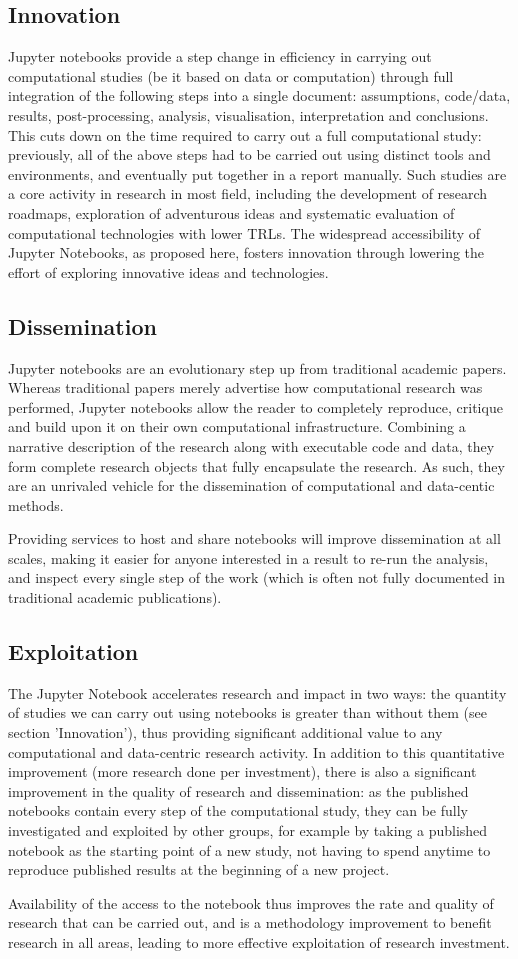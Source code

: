 \subsection{Innovation}

Jupyter notebooks provide a step change in efficiency in carrying out
computational studies (be it based on data or computation) through
full integration of the following steps into a single document:
assumptions, code/data, results, post-processing, analysis,
visualisation, interpretation and conclusions. This cuts down on the
time required to carry out a full computational study: previously, all
of the above steps had to be carried out using distinct tools and
environments, and eventually put together in a report manually. Such
studies are a core activity in research in most field, including the
development of research roadmaps, exploration of adventurous ideas and
systematic evaluation of computational technologies with lower
TRLs. The widespread accessibility of Jupyter Notebooks, as proposed
here, fosters innovation through lowering the effort of exploring
innovative ideas and technologies.


\subsection{Dissemination}

Jupyter notebooks are an evolutionary step up from traditional
academic papers.  Whereas traditional papers merely advertise how
computational research was performed, Jupyter notebooks allow the
reader to completely reproduce, critique and build upon it on their
own computational infrastructure.  Combining a narrative description
of the research along with executable code and data, they form
complete research objects that fully encapsulate the research. As
such, they are an unrivaled vehicle for the dissemination of
computational and data-centic methods.

Providing services to host and share notebooks will improve
dissemination at all scales, making it easier for anyone interested in
a result to re-run the analysis, and inspect every single step of the
work (which is often not fully documented in traditional academic
publications).

\subsection{Exploitation}

The Jupyter Notebook accelerates research and impact in two ways: the
quantity of studies we can carry out using notebooks is greater than
without them (see section 'Innovation'), thus providing significant
additional value to any computational and data-centric research
activity. In addition to this quantitative improvement (more research
done per investment), there is also a significant improvement in the
quality of research and dissemination: as the published notebooks
contain every step of the computational study, they can be fully
investigated and exploited by other groups, for example by taking a
published notebook as the starting point of a new study, not having to
spend anytime to reproduce published results at the beginning of a new
project.

Availability of the access to the notebook thus improves the rate and
quality of research that can be carried out, and is a methodology
improvement to benefit research in all areas, leading to more
effective exploitation of research investment.
